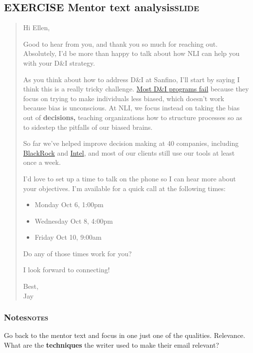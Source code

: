 \documentclass[11pt]{article}
\begin{document}
\subsection{{\bfseries\sffamily EXERCISE} Mentor text analysis\hfill{}\textsc{slide}}
\label{sec:org98838e0}
\begin{quote}
Hi Ellen,

Good to hear from you, and thank you so much for reaching out. Absolutely, I'd be more than happy to talk about how NLI can help you with your D\&I strategy.

As you think about how to address D\&I at Sanfino, I'll start by saying I think this is a really tricky challenge. \href{//hbr.org/2016/07/why-diversity-programs-fail}{Most D\&I programs fail} because they focus on trying to make individuals less biased, which doesn't work because bias is unconscious. At NLI, we focus instead on taking the bias out of \textbf{decisions,} teaching organizations how to structure processes so as to sidestep the pitfalls of our biased brains.

So far we've helped improve decision making at 40 companies, including \href{https://neuroleadership.com/portfolio-items/case-study-blackrock-breaking-bias/}{BlackRock} and \href{https://neuroleadership.com/portfolio-items/nli-transforms-intel-culture/}{Intel}, and most of our clients still use our tools at least once a week.

I'd love to set up a time to talk on the phone so I can hear more about your objectives. I'm available for a quick call at the following times:

\begin{itemize}
\item Monday Oct 6, 1:00pm
\item Wednesday Oct 8, 4:00pm
\item Friday Oct 10, 9:00am
\end{itemize}

Do any of those times work for you?

I look forward to connecting!

Best, \\
Jay
\end{quote}

\subsubsection{Notes\hfill{}\textsc{notes}}
\label{sec:org549b582}
Go back to the mentor text and focus in one just one of the qualities. Relevance. What are the \textbf{techniques} the writer used to make their email relevant?
\end{document}
